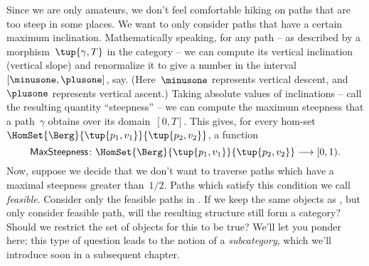 Since we are only amateurs, we don't feel comfortable hiking on paths that are too steep in some places.
We want to only consider paths that have a certain maximum inclination.
Mathematically speaking, for any path -- as described by a morphism~$\tup{\gamma, T}$ in the category \Berg -- we can compute its vertical inclination (vertical slope) and renormalize it to give a number in the interval~$[\minusone, \plusone]$, say.
(Here~$\minusone$ represents vertical descent, and~$\plusone$ represents vertical ascent.) Taking absolute values of inclinations -- call the resulting quantity ``steepness'' -- we can compute the maximum steepness that a path~$\gamma$ obtains over its domain~$[0,T]$.
This gives, for every hom-set~$\HomSet{\Berg}{\tup{p_1, v_1}}{\tup{p_2, v_2}}$, a function
\begin{equation}
    \mathsf{MaxSteepness}\colon \HomSet{\Berg}{\tup{p_1, v_1}}{\tup{p_2, v_2}} \longrightarrow [0, 1).
\end{equation}
Now, suppose we decide that we don't want to traverse paths which have a maximal steepness greater than~$1/2$.
Paths which satisfy this condition we call \emph{feasible}.
Consider only the feasible paths in \Berg.
If we keep the same objects as \Berg, but only consider feasible path, will the resulting structure still form a category?
Should we restrict the set of objects for this to be true?
We'll let you ponder here; this type of question leads to the notion of a \emph{subcategory}, which we'll introduce soon in a subsequent chapter.

